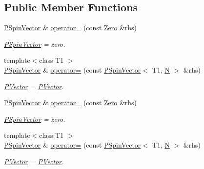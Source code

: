 \subsection*{Public Member Functions}
\begin{DoxyCompactItemize}
\item 
\mbox{\hyperlink{classENSEM_1_1PSpinVector}{P\+Spin\+Vector}} \& \mbox{\hyperlink{classENSEM_1_1PSpinVector_aff99857da5f6f68093f04c9df5355e84}{operator=}} (const \mbox{\hyperlink{structENSEM_1_1Zero}{Zero}} \&rhs)
\begin{DoxyCompactList}\small\item\em \mbox{\hyperlink{classENSEM_1_1PSpinVector}{P\+Spin\+Vector}} = zero. \end{DoxyCompactList}\item 
{\footnotesize template$<$class T1 $>$ }\\\mbox{\hyperlink{classENSEM_1_1PSpinVector}{P\+Spin\+Vector}} \& \mbox{\hyperlink{classENSEM_1_1PSpinVector_a6c7a984a7ab5ad8939e0a9bc57a93660}{operator=}} (const \mbox{\hyperlink{classENSEM_1_1PSpinVector}{P\+Spin\+Vector}}$<$ T1, \mbox{\hyperlink{adat__devel_2lib_2hadron_2operator__name__util_8cc_a7722c8ecbb62d99aee7ce68b1752f337}{N}} $>$ \&rhs)
\begin{DoxyCompactList}\small\item\em \mbox{\hyperlink{classENSEM_1_1PVector}{P\+Vector}} = \mbox{\hyperlink{classENSEM_1_1PVector}{P\+Vector}}. \end{DoxyCompactList}\item 
\mbox{\hyperlink{classENSEM_1_1PSpinVector}{P\+Spin\+Vector}} \& \mbox{\hyperlink{classENSEM_1_1PSpinVector_aff99857da5f6f68093f04c9df5355e84}{operator=}} (const \mbox{\hyperlink{structENSEM_1_1Zero}{Zero}} \&rhs)
\begin{DoxyCompactList}\small\item\em \mbox{\hyperlink{classENSEM_1_1PSpinVector}{P\+Spin\+Vector}} = zero. \end{DoxyCompactList}\item 
{\footnotesize template$<$class T1 $>$ }\\\mbox{\hyperlink{classENSEM_1_1PSpinVector}{P\+Spin\+Vector}} \& \mbox{\hyperlink{classENSEM_1_1PSpinVector_a6c7a984a7ab5ad8939e0a9bc57a93660}{operator=}} (const \mbox{\hyperlink{classENSEM_1_1PSpinVector}{P\+Spin\+Vector}}$<$ T1, \mbox{\hyperlink{adat__devel_2lib_2hadron_2operator__name__util_8cc_a7722c8ecbb62d99aee7ce68b1752f337}{N}} $>$ \&rhs)
\begin{DoxyCompactList}\small\item\em \mbox{\hyperlink{classENSEM_1_1PVector}{P\+Vector}} = \mbox{\hyperlink{classENSEM_1_1PVector}{P\+Vector}}. \end{DoxyCompactList}\item 

\end{DoxyCompactItemize}
